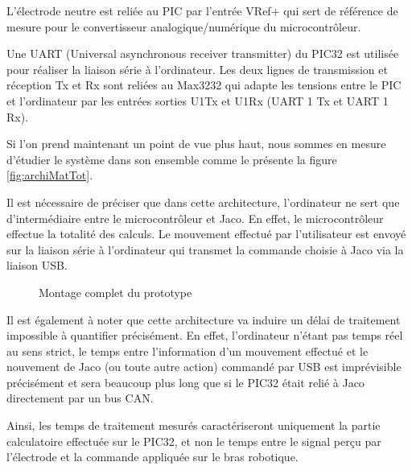 \documentclass[letterpaper, twoside, 12pt, memoire, creativecommons, hyperref]{thETS}
\begin{document}
L'électrode neutre est reliée au PIC par l'entrée VRef+ qui sert de référence de mesure pour le convertisseur analogique/numérique du microcontrôleur. 

Une UART (Universal asynchronous receiver transmitter) du PIC32 est utilisée pour réaliser la liaison série à l'ordinateur. Les deux lignes de transmission et réception Tx et Rx sont reliées au Max3232 qui adapte les tensions entre le PIC et l'ordinateur par les entrées sorties U1Tx et U1Rx (UART 1 Tx et UART 1 Rx).

Si l'on prend maintenant un point de vue plus haut, nous sommes en mesure d'étudier le système dans son ensemble comme le présente la figure \ref{fig:archiMatTot}.


Il est nécessaire de préciser que dans cette architecture, l'ordinateur ne sert que d'intermédiaire entre le microcontrôleur et Jaco. En effet, le microcontrôleur effectue la totalité des calculs. Le mouvement effectué par l'utilisateur est envoyé sur la liaison série à l'ordinateur qui transmet la commande choisie à Jaco via la liaison USB. 

\begin{figure}
	\centering
	\caption{Montage complet du prototype}
	\label{fig:archiMatMont}
\end{figure}

Il est également à noter que cette architecture va induire un délai de traitement impossible à quantifier précisément. En effet, l'ordinateur n'étant pas temps réel au sens strict, le temps entre l'information d'un mouvement effectué et le nouvement de Jaco (ou toute autre action) commandé par USB est imprévisible précisément et sera beaucoup plus long que si le PIC32 était relié à Jaco directement par un bus CAN. 

Ainsi, les temps de traitement mesurés caractériseront uniquement la partie calculatoire effectuée sur le PIC32, et non le temps entre le signal perçu par l'électrode et la commande appliquée sur le bras robotique.
\end{document}
